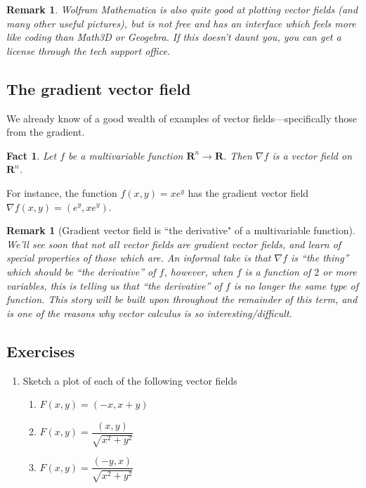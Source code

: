 \documentclass[12pt]{article}
\numberwithin{equation}{subsection}
\numberwithin{figure}{subsection}
\newtheorem{fact}[subsection]{Fact}
\theoremstyle{note}
\newtheorem{remark}[subsection]{Remark}
\begin{document}
{\begin{remark}
Wolfram Mathematica is also quite good at plotting vector fields (and many other useful pictures), but is not free and has an interface which feels more like coding than Math3D or Geogebra. If this doesn't daunt you, you can get a license through the tech support office.  \end{remark}

\subsection{The gradient vector field}
We already know of a good wealth of examples of vector fields---specifically those from the gradient. 

\begin{fact} Let $f$ be a multivariable function $\mathbf{R}^n\to \mathbf{R}$. Then $\nabla f$ is a vector field on $\mathbf{R}^n$. 
\end{fact}

For instance, the function $f(x,y)=xe^y$ has the gradient vector field $\nabla f (x,y)=(e^y, xe^y)$. 

\begin{remark}[Gradient vector field is ``the derivative" of a multivariable function]We'll see soon that not all vector fields are gradient vector fields, and learn of special properties of those which are. An informal take is that $\nabla f$ is ``the thing'' which should be ``the derivative'' of $f$, however, when $f$ is a function of $2$ or more variables, this is telling us that ``the derivative'' of $f$ is no longer the same type of function. This story will be built upon throughout the remainder of this term, and is one of the reasons why vector calculus is so interesting/difficult.\end{remark}

\subsection{Exercises}

\begin{enumerate}[label=\arabic*.]
\item Sketch a plot of each of the following vector fields

\begin{enumerate}
	\item $F(x,y)=(-x, x+y)$
	\item $F(x,y)=\dfrac{(x,y)}{\sqrt{x^2+y^2}}$
	\item $F(x,y)=\dfrac{(-y,x)}{\sqrt{x^2+y^2}}$
\end{enumerate}


\end{enumerate}}
\end{document}

